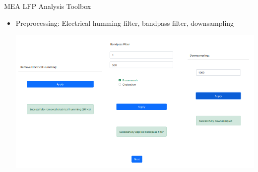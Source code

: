 \documentclass[10pt]{beamer}
\begin{document}
\begin{frame}[allowframebreaks]{MEA LFP Analysis Toolbox}
\begin{itemize}
     \item Preprocessing: Electrical humming filter, bandpass filter, downsampling \\ [1em]
      \begin{center}
        \includegraphics[keepaspectratio,width=0.8\framewidth]{img/4_preproc.png}
      \end{center} 
      \framebreak
      

\end{itemize}
\end{frame}
\end{document}
